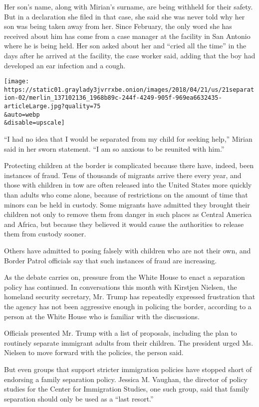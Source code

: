 Her son's name, along with Mirian's surname, are being withheld for
their safety. But in a declaration she filed in that case, she said she
was never told why her son was being taken away from her. Since
February, the only word she has received about him has come from a case
manager at the facility in San Antonio where he is being held. Her son
asked about her and ``cried all the time'' in the days after he arrived
at the facility, the case worker said, adding that the boy had developed
an ear infection and a cough.

\texttt{[image: https://static01.graylady3jvrrxbe.onion/images/2018/04/21/us/21separation-02/merlin\_137102136\_1968b89c-244f-4249-905f-969ea6632435-articleLarge.jpg?quality=75\\\&auto=webp\\\&disable=upscale]}

``I had no idea that I would be separated from my child for seeking
help,'' Mirian said in her sworn statement. ``I am so anxious to be
reunited with him.''

Protecting children at the border is complicated because there have,
indeed, been instances of fraud. Tens of thousands of migrants arrive
there every year, and those with children in tow are often released into
the United States more quickly than adults who come alone, because of
restrictions on the amount of time that minors can be held in custody.
Some migrants have admitted they brought their children not only to
remove them from danger in such places as Central America and Africa,
but because they believed it would cause the authorities to release them
from custody sooner.

Others have admitted to posing falsely with children who are not their
own, and Border Patrol officials say that such instances of fraud are
increasing.

As the debate carries on, pressure from the White House to enact a
separation policy has continued. In conversations this month with
Kirstjen Nielsen, the homeland security secretary, Mr. Trump has
repeatedly expressed frustration that the agency has not been aggressive
enough in policing the border, according to a person at the White House
who is familiar with the discussions.

Officials presented Mr. Trump with a list of proposals, including the
plan to routinely separate immigrant adults from their children. The
president urged Ms. Nielsen to move forward with the policies, the
person said.

But even groups that support stricter immigration policies have stopped
short of endorsing a family separation policy. Jessica M. Vaughan, the
director of policy studies for the Center for Immigration Studies, one
such group, said that family separation should only be used as a ``last
resort.''

